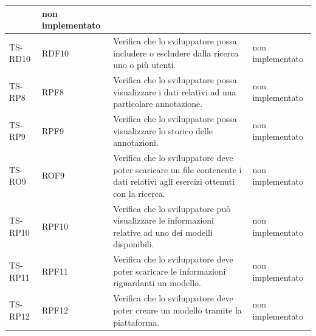 \begin{longtable}{|>{\centering\arraybackslash}m{1.6cm}|>{\centering\arraybackslash}m{1.7cm}|m{6.41cm}|>{\centering\arraybackslash}m{3.1cm}|}
		& non implementato\\ \hline
		\rowcolor{LightGray}
		TS-RD10		
		& RDF10 
		& Verifica che lo sviluppatore possa includere o escludere dalla ricerca uno o più utenti. 
		& non implementato\\ \hline 
		\rowcolor{white}
		TS-RP8		
		& RPF8 
		& Verifica che lo sviluppatore possa visualizzare i dati relativi ad una particolare annotazione. 		
		& non implementato\\ \hline
		\rowcolor{LightGray}
		TS-RP9		
		& RPF9 
		& Verifica che lo sviluppatore possa visualizzare lo storico delle annotazioni. 
		&  non implementato\\ \hline
		\rowcolor{white}
		TS-RO9
		& ROF9 
		& Verifica che lo sviluppatore deve poter scaricare un file contenente i dati relativi agli esercizi ottenuti con la ricerca.
		& non implementato\\ \hline
		\rowcolor{LightGray}
		TS-RP10		
		& RPF10 
		& Verifica che lo sviluppatore può visualizzare le informazioni relative ad uno dei modelli disponibili. 
		& non implementato\\ \hline
		\rowcolor{white}
		TS-RP11		
		& RPF11 
		& Verifica che lo sviluppatore deve poter scaricare le informazioni riguardanti un modello. 
		& non implementato\\ \hline
		\rowcolor{LightGray}
		TS-RP12		
		& RPF12 
		& Verifica che lo sviluppatore deve poter creare un modello tramite la piattaforma. 
		& non implementato\\ \hline	
		

\end{longtable}

